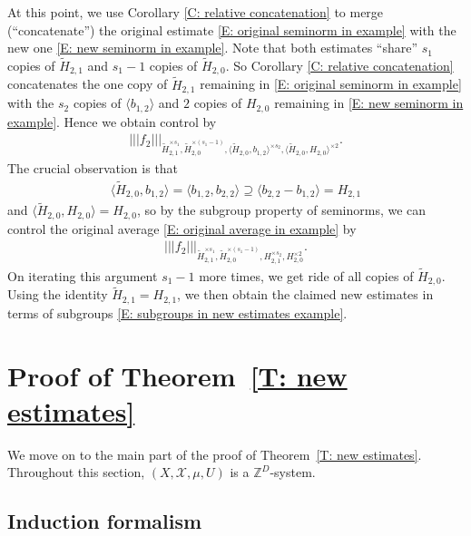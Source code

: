 \documentclass[11pt]{amsart}
\theoremstyle{definition}
\newcommand{\Z}{{\mathbb Z}}
\newcommand{\CX}{{\mathcal X}}
\newcommand{\nnorm}[1]{\lvert\!|\!| #1|\!|\!\rvert}
\newcommand{\1}{{\mathbf{1}}}
\begin{document}
    At this point, we use Corollary \ref{C: relative concatenation} to merge (``concatenate'') the original estimate \eqref{E: original seminorm in example} with the new one \eqref{E: new seminorm in example}. Note that both estimates ``share'' $s_1$ copies of $\tilde H_{2,1}$ and $s_1-1$ copies of $\tilde H_{2,0}$. So Corollary \ref{C: relative concatenation} concatenates the one copy of $\tilde H_{2,1}$ remaining in \eqref{E: original seminorm in example} with the $s_2$ copies of $\langle b_{1,2}\rangle$ and $2$ copies of $H_{2,0}$ remaining in \eqref{E: new seminorm in example}. Hence we obtain control by
    \begin{align*}
        \nnorm{f_2}_{\tilde H_{2,1}^{\times s_1},\tilde H_{2,0}^{\times (s_1-1)}, \langle \tilde H_{2,0}, b_{1,2}\rangle^{\times s_2}, \langle \tilde H_{2,0}, H_{2,0}\rangle^{\times 2}}.
    \end{align*}
    The crucial observation is that
    \begin{align*}
        \langle \tilde H_{2,0}, b_{1,2}\rangle = \langle b_{1,2}, b_{2,2} \rangle \supseteq  \langle b_{2,2}-b_{1,2}\rangle = H_{2,1}
    \end{align*}
    and $\langle \tilde H_{2,0}, H_{2,0}\rangle = H_{2,0}$, so by the subgroup property of seminorms, we can control the original average \eqref{E: original average in example} by
    \begin{align*}
        \nnorm{f_2}_{\tilde H_{2,1}^{\times s_1},\tilde H_{2,0}^{\times (s_1-1)}, H_{2,1}^{\times s_2}, H_{2,0}^{\times 2}}.
    \end{align*}
    On iterating this argument $s_1-1$ more times, we get ride of all copies of $\tilde H_{2,0}$. Using the identity $\tilde H_{2,1} = H_{2,1}$, we then obtain the claimed new estimates in terms of subgroups \eqref{E: subgroups in new estimates example}.

\section{Proof of Theorem~\ref{T: new estimates}}\label{S: seminorm estimates}
We move on to the main part of the proof of Theorem~\ref{T: new estimates}. Throughout this section, $(X, \CX, \mu, U)$ is a $\Z^D$-system.


\subsection{Induction formalism}
\end{document}
